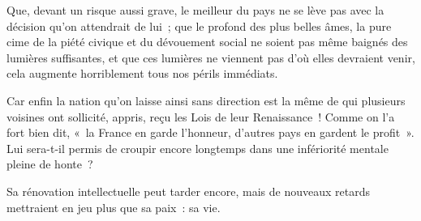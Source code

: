 \documentclass[french,twoside]{book} %
\begin{document}
Que, devant un risque aussi grave, le meilleur du pays ne se lève pas avec la décision qu’on attendrait de lui ; que le profond des plus belles âmes, la pure cime de la piété civique et du dévouement social ne soient pas même baignés des lumières suffisantes, et que ces lumières ne viennent pas d’où elles devraient venir, cela augmente horriblement tous nos périls immédiats.\par
Car enfin la nation qu’on laisse ainsi sans direction est la même de qui plusieurs voisines ont sollicité, appris, reçu les Lois de leur Renaissance ! Comme on l’a fort bien dit, « la France en garde l’honneur, d’autres pays en gardent le profit ». Lui sera-t-il permis de croupir encore longtemps dans une infériorité mentale pleine de honte ?\par
Sa rénovation intellectuelle peut tarder encore, mais de nouveaux retards mettraient en jeu plus que sa paix : sa vie.
\end{document}

